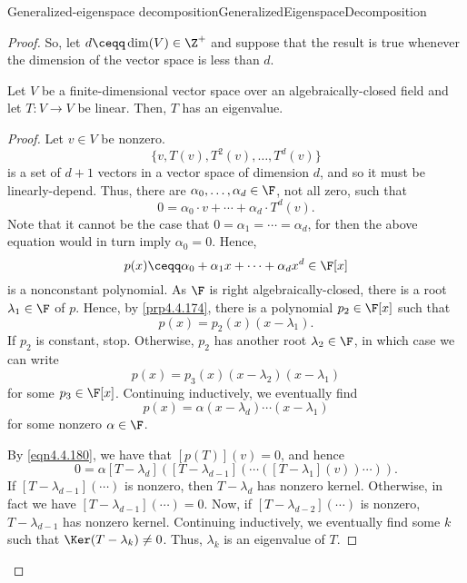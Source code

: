 \begin{thm}{Generalized-eigenspace decomposition\hfill}{GeneralizedEigenspaceDecomposition}
\begin{proof}
		So, let $d\ceqq \dim (V)\in \Z ^+$ and suppose that the result is true whenever the dimension of the vector space is less than $d$.
		\begin{lma}{}{}
			Let $V$ be a finite-dimensional vector space over an algebraically-closed field and let $T\colon V\rightarrow V$ be linear.  Then, $T$ has an eigenvalue.
			\begin{proof}
				Let $v\in V$ be nonzero.
				\begin{equation}
				\{ v,T(v),T^2(v),\ldots ,T^d(v)\}
				\end{equation}
				is a set of $d+1$ vectors in a vector space of dimension $d$, and so it must be linearly-depend.  Thus, there are $\alpha _0,\ldots ,\alpha _d\in \F$, not all zero, such that
				\begin{equation}\label{eqn4.4.180}
				0=\alpha _0\cdot v+\cdots +\alpha _d\cdot T^d(v).
				\end{equation}
				Note that it cannot be the case that $0=\alpha _1=\cdots =\alpha _d$, for then the above equation would in turn imply $\alpha _0=0$.  Hence,
				\begin{equation}
					p(x)\ceqq \alpha _0+\alpha _1x+\cdots +\alpha _dx^d\in \F [x]
				\end{equation}
				is a nonconstant polynomial.  As $\F$ is right algebraically-closed, there is a root $\lambda _1\in \F$ of $p$.  Hence, by \cref{prp4.4.174}, there is a polynomial $p_2\in \F [x]$ such that
				\begin{equation}
					p(x)=p_2(x)(x-\lambda _1).
				\end{equation}
				If $p_2$ is constant, stop.  Otherwise, $p_2$ has another root $\lambda _2\in \F$, in which case we can write
				\begin{equation}
					p(x)=p_3(x)(x-\lambda _2)(x-\lambda _1)
				\end{equation}
				for some $p_3\in \F [x]$.  Continuing inductively, we eventually find
				\begin{equation}
					p(x)=\alpha (x-\lambda _d)\cdots (x-\lambda _1)
				\end{equation}
				for some nonzero $\alpha \in \F$.
				
				By \eqref{eqn4.4.180}, we have that $[p(T)](v)=0$, and hence
				\begin{equation}
					0=\alpha [T-\lambda _d]\left( [T-\lambda _{d-1}]\left( \cdots ([T-\lambda _1](v))\cdots \right) \right) .
				\end{equation}
				If $[T-\lambda _{d-1}](\cdots )$ is nonzero, then $T-\lambda _d$ has nonzero kernel.  Otherwise, in fact we have $[T-\lambda _{d-1}](\cdots )=0$.  Now, if $[T-\lambda _{d-2}](\cdots )$ is nonzero, $T-\lambda _{d-1}$ has nonzero kernel.  Continuing inductively, we eventually find some $k$ such that $\Ker (T-\lambda _k)\neq 0$.  Thus, $\lambda _k$ is an eigenvalue of $T$.
			\end{proof}
		\end{lma}
	

\end{proof}
\end{thm}

